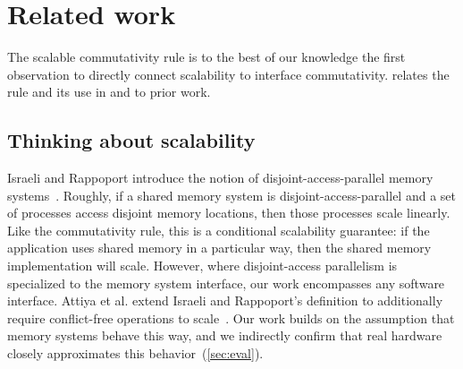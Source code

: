 \section{Related work}
\label{sec:related}


The scalable commutativity rule is to the best of our knowledge the
first observation to directly connect scalability to interface
commutativity.
 relates the rule and its use
in \sys and \tool to prior work.

\subsection{Thinking about scalability}

Israeli and Rappoport introduce the notion of disjoint-access-parallel
memory systems~\cite{israeli:disjoint-access}.  Roughly, if a shared memory system
is disjoint-access-parallel and a set of processes access disjoint memory
locations, then those processes scale linearly.  Like the commutativity rule,
this is a conditional scalability guarantee: if the application uses shared
memory in a particular way, then the shared memory implementation will scale.
However, where disjoint-access parallelism is specialized to the memory system
interface, our work encompasses any software interface.
%
Attiya et al. extend Israeli and Rappoport's definition to additionally require
conflict-free operations to scale~\cite{attiya:disjoint}.
%
Our work builds on the assumption that
memory systems behave this way, and we indirectly confirm that real hardware
closely approximates this behavior~(\cref{sec:eval}).



